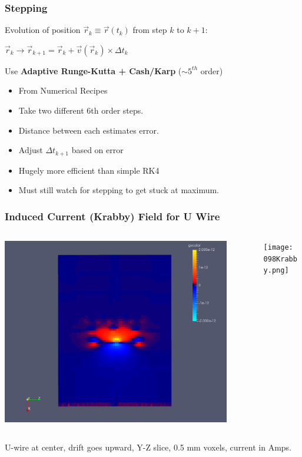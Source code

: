 \documentclass[xcolor=dvipsnames]{beamer}
\begin{document}
\begin{frame}[fragile]
  \frametitle{Stepping}
  Evolution of position $\vec{r}_k \equiv \vec{r}(t_k)$ from step $k$ to $k+1$:
  \begin{center}
    $\vec{r}_k \rightarrow \vec{r}_{k+1} = \vec{r}_k + \vec{v}(\vec{r}_k) \times \Delta t_k$
  \end{center}
  Use \textbf{Adaptive Runge-Kutta + Cash/Karp} ($\sim 5^{th}$ order)
  \begin{itemize}
  \item From Numerical Recipes
  \item Take two different 6th order steps.
  \item Distance between each estimates error.
  \item Adjust $\Delta t_{k+1}$ based on error
  \item Hugely more efficient than simple RK4
  \item Must still watch for stepping to get stuck at maximum.
  \end{itemize}
\end{frame}

\begin{frame}[fragile]
  \frametitle{Induced Current (Krabby) Field for U Wire}
  \begin{columns}
    \begin{column}{0.8\textwidth}
      \includegraphics[width=0.9\textwidth]{demon-current.png}      
    \end{column}
    \begin{column}{0.2\textwidth}
      \texttt{[image: 098Krabby.png]}          
    \end{column}
  \end{columns}

  \begin{center}
  \footnotesize
  U-wire at center, drift goes upward, Y-Z slice, 0.5 mm voxels, current in Amps.
    
  \end{center}
\end{frame}
\end{document}
